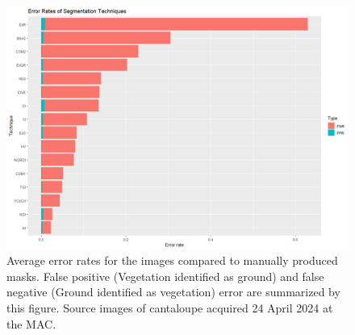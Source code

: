 \documentclass[letterpaper, notitlepage]{report}
\begin{document}
{%
\begin{figure}[h]
	\centering
	\includegraphics[width=\linewidth]{figures/segmentation-error-rates.png}
	\caption[Error rates of segmentation algorithms]{Average error rates for the images compared to manually produced masks. False positive (Vegetation identified as ground) and false negative (Ground identified as vegetation) error are summarized by this figure. Source images of cantaloupe acquired 24 April 2024 at the MAC. }
	\label{fig:segmentation-errors}
\end{figure}





}
\end{document}
